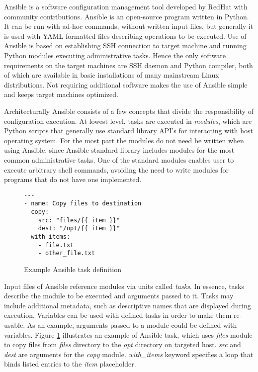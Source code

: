 Ansible \cite{ansible} is a software configuration management tool developed by
RedHat with community contributions. Ansible is an open-source program written
in Python. It can be run with ad-hoc commands, without written input files, but
generally it is used with YAML formatted files describing operations to be
executed. Use of Ansible is based on establishing SSH connection to target
machine and running Python modules executing administrative tasks. Hence the
only software requirements on the target machines are SSH daemon and Python
compiler, both of which are available in basic installations of many mainstream
Linux distributions. Not requiring additional software makes the use of Ansible
simple and keeps target machines optimized.

Architecturally Ansible consists of a few concepts that divide the
responsibility of configuration execution. At lowest level, tasks are executed
in \textit{modules}, which are Python scripts that generally use standard
library API's for interacting with host operating system. For the most part the
modules do not need be written when using Ansible, since Ansible standard
library includes modules for the most common administrative tasks. One of the
standard modules enables user to execute arbitrary shell commands, avoiding the
need to write modules for programs that do not have one implemented.

\begin{figure}[t]
\centering
\begin{verbatim}
---
- name: Copy files to destination
  copy:
    src: "files/{{ item }}"
    dest: "/opt/{{ item }}"
  with_items:
    - file.txt
    - other_file.txt
\end{verbatim}

\caption{Example Ansible task definition}
\label{fig:ansible-task}
\end{figure}

Input files of Ansible reference modules via units called \textit{tasks}. In
essence, tasks describe the module to be executed and arguments passed to
it. Tasks may include additional metadata, such as descriptive names that are
displayed during execution. Variables can be used with defined tasks in order
to make them re-usable. As an example, arguments passed to a module could be
defined with variables. Figure \ref{fig:ansible-task} illustrates an example of
Ansible task, which uses \textit{files} module to copy files from
\textit{files} directory to the \textit{opt} directory on targeted host.
\textit{src} and \textit{dest} are arguments for the \textit{copy} module.
\textit{with\_items} keyword specifies a loop that binds listed entries to the
\textit{item} placeholder.

